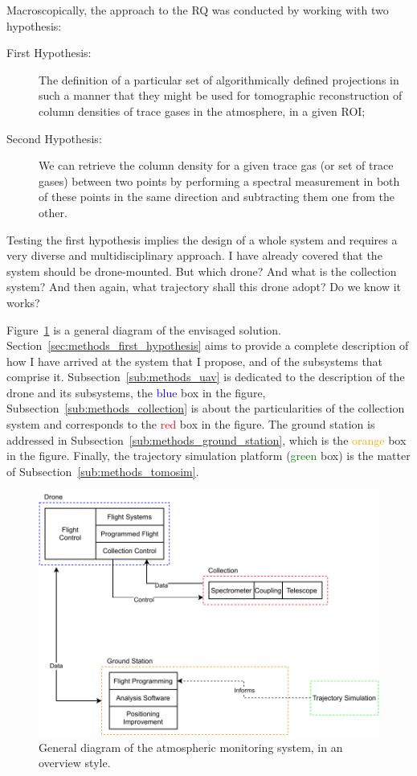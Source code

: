 Macroscopically, the approach to the \gls{RQ} was conducted by working
with two hypothesis:
\begin{description}
    \item[First Hypothesis:] The definition of a particular set of
        algorithmically defined projections in such a manner that they
        might be used for tomographic reconstruction of column densities
        of trace gases in the atmosphere, in a given \gls{ROI};
    \item[Second Hypothesis:] We can retrieve the column density for a
        given trace gas (or set of trace gases) between two points by
        performing a spectral measurement in both of these points in the
        same direction and subtracting them one from the other.
\end{description}

Testing the first hypothesis implies the design of a whole system and
requires a very diverse and multidisciplinary approach. I have already
covered that the system should be drone-mounted. But which drone? And
what is the collection system? And then again, what trajectory shall
this drone adopt? Do we know it works?

Figure~\ref{fig:general_system_schematic} is a general diagram of the
envisaged solution. Section~\ref{sec:methods_first_hypothesis} aims to
provide a complete description of how I have arrived at the system that
I propose, and of the subsystems that comprise it.
Subsection~\ref{sub:methods_uav} is dedicated to the description of the
drone and its subsystems, the \textcolor{blue}{blue} box in the figure,
Subsection~\ref{sub:methods_collection} is about the particularities of
the collection system and corresponds to the \textcolor{red}{red} box in
the figure. The ground station is addressed in
Subsection~\ref{sub:methods_ground_station}, which is the
\textcolor{orange}{orange} box in the figure. Finally, the trajectory
simulation platform (\textcolor{green}{green} box) is the matter of
Subsection~\ref{sub:methods_tomosim}.

\begin{figure}[htpb]
    \centering
    \includegraphics[width=.8\textwidth]{img/pdf/general_system_diagram.pdf}
    \caption{General diagram of the atmospheric monitoring system, in an
    overview style.}%
    \label{fig:general_system_schematic}
\end{figure}

